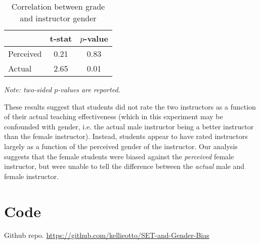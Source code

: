 \documentclass[12pt]{article}
\begin{document}
\begin{table}[htbp]
  \centering
  \footnotesize 
  \caption{Correlation between grade and instructor gender}
    \begin{tabular}{lcc}
    \toprule 
                     & t-stat   & $p$-value    \\
   \midrule
    Perceived &         0.21       & 0.83      \\
    Actual  &            2.65       & 0.01      \\
    \bottomrule
    \end{tabular}%
 \label{tab:macnell4}%
 
\textit{Note: two-sided $p$-values are reported.}
\end{table}%
\normalsize

 These results suggest that students did not rate the two instructors as a function of their actual teaching effectiveness (which in this experiment may be confounded with gender, i.e. the actual male instructor being a better instructor than the female instructor). Instead, students appear to have rated instructors largely as a function of the perceived gender of the instructor. Our analysis suggests that the female students were biased against the \textit{perceived} female instructor, but were unable to tell the difference between the \textit{actual} male and female instructor. 



\section{Code}
Github repo. \url{https://github.com/kellieotto/SET-and-Gender-Bias}



\end{document}
